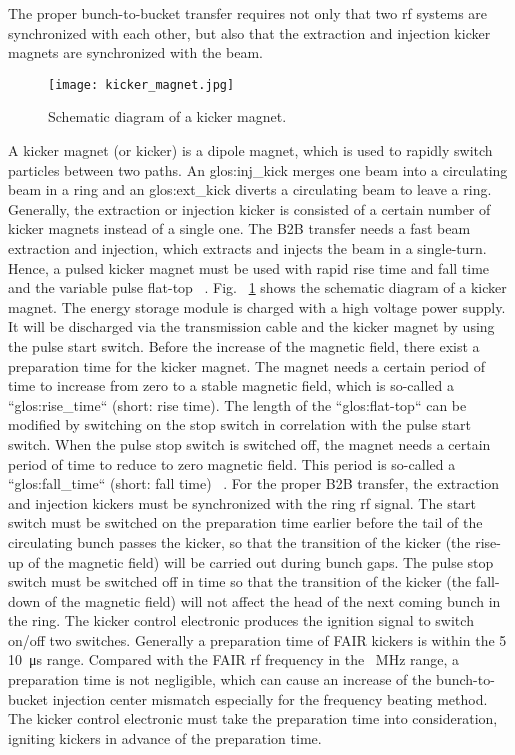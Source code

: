 The proper bunch-to-bucket transfer requires not only that two rf systems are synchronized with each other, but also that the extraction and injection kicker magnets are synchronized with the beam.

\begin{figure}[!htb]
   \centering   
   \texttt{[image: kicker\_magnet.jpg]}
   \caption{Schematic diagram of a kicker magnet.}
   \label{kicker_magnet}
\end{figure}

A kicker magnet (or kicker) is a dipole magnet, which is used to rapidly switch particles between two paths. An \gls{glos:inj_kick} merges one beam into a circulating beam in a ring and an \gls{glos:ext_kick} diverts a circulating beam to leave a ring. Generally, the extraction or injection kicker is consisted of a certain number of kicker magnets instead of a single one. The B2B transfer needs a fast beam extraction and injection, which extracts and injects the beam in a single-turn. Hence, a pulsed kicker magnet must be used with rapid rise time and fall time and the variable pulse flat-top ~\cite{petzenhauser_concept_2016}. Fig. ~\ref{kicker_magnet} shows the schematic diagram of a kicker magnet. The energy storage module is charged with a high voltage power supply. It will be discharged via the transmission cable and the kicker magnet by using the pulse start switch. Before the increase of the magnetic field, there exist a preparation time for the kicker magnet. The magnet needs a certain period of time to increase from zero to a stable magnetic field, which is so-called a ``\gls{glos:rise_time}`` (short: rise time). The length of the ``\gls{glos:flat-top}`` can be modified by switching on the stop switch in correlation with the pulse start switch. When the pulse stop switch is switched off, the magnet needs a certain period of time to reduce to zero magnetic field. This period is so-called a ``\gls{glos:fall_time}`` (short: fall time) ~\cite{blell_injection_2014}. For the proper B2B transfer, the extraction and injection kickers must be synchronized with the ring rf signal. The start switch must be switched on the preparation time earlier before the tail of the circulating bunch passes the kicker, so that the transition of the kicker (the rise-up of the magnetic field) will be carried out during bunch gaps. The pulse stop switch must be switched off in time so that the transition of the kicker (the fall-down of the magnetic field) will not affect the head of the next coming bunch in the ring. The kicker control electronic produces the ignition signal to switch on/off two switches. Generally a preparation time of FAIR kickers is within the \SI{5}{}$~$\SI{10}{\micro\second} range. Compared with the FAIR rf frequency in the \SI{}{MHz} range, a preparation time is not negligible, which can cause an increase of the bunch-to-bucket injection center mismatch especially for the frequency beating method. The kicker control electronic must take the preparation time into consideration, igniting kickers in advance of the preparation time.

